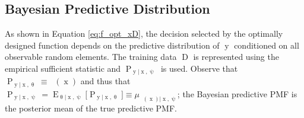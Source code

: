 \documentclass{article}
\DeclareMathOperator{\xrm}{\mathrm{x}}
\DeclareMathOperator{\yrm}{\mathrm{y}}
\DeclareMathOperator{\Drm}{\mathrm{D}}
\DeclareMathOperator{\Prm}{\mathrm{P}}
\DeclareMathOperator{\Erm}{\mathrm{E}}
\DeclareMathOperator{\upthetac}{\uptheta_\text{c}}
\begin{document}
\subsection{Bayesian Predictive Distribution}

As shown in Equation \eqref{eq:f_opt_xD}, the decision selected by the optimally designed function depends on the predictive distribution of $\yrm$ conditioned on all observable random elements. The training data $\Drm$ is represented using the empirical sufficient statistic and $\Prm_{\yrm | \xrm,\uppsi}$ is used. Observe that $\Prm_{\yrm | \xrm,\uptheta} \equiv \upthetac(\xrm)$ and thus that $\Prm_{\yrm | \xrm,\uppsi} = \Erm_{\uptheta | \xrm,\uppsi}\big[ \Prm_{\yrm | \xrm,\uptheta} \big] \equiv \mu_{\upthetac(\xrm) | \xrm,\uppsi}$; the Bayesian predictive PMF is the posterior mean \cite{murphy} of the true predictive PMF.
\end{document}
